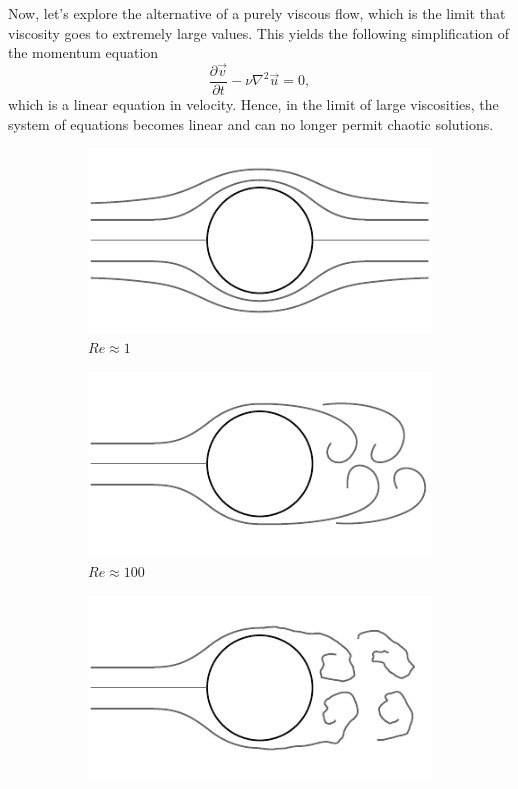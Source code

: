 Now, let's explore the alternative of a purely viscous flow, which is the limit that viscosity goes to extremely large values. This yields the following simplification of the momentum equation
\begin{equation}
	\frac{\partial \vec{v}}{\partial t} - \nu \nabla^2 \vec{u} = 0,
\end{equation}
which is a linear equation in velocity. Hence, in the limit of large viscosities, the system of equations becomes linear and can no longer permit chaotic solutions.
\begin{figure}[tbp]
	\centering
	\begin{subfigure}[b]{0.40\textwidth}
		\includegraphics[width=\linewidth]{Pictures/cylinder_1}
		\caption{$Re\approx1$}
	\end{subfigure}
	\begin{subfigure}[b]{0.40\textwidth}
		\includegraphics[width=\linewidth]{Pictures/cylinder_2}
		\caption{$Re\approx100$}
	\end{subfigure}
	\begin{subfigure}[b]{0.40\textwidth}
		\includegraphics[width=\linewidth]{Pictures/cylinder_3}

\end{subfigure}
\end{figure}
